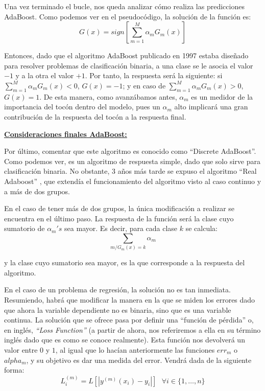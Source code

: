 \documentclass[12pt,twoside]{article}
\begin{document}
Una vez terminado el bucle, nos queda analizar cómo realiza las predicciones AdaBoost. Como podemos ver en el pseudocódigo, la solución de la función es:
\begin{equation*}
G(x) = sign \left[ \sum_{m=1}^M \alpha_m G_m(x) \right]
\end{equation*}

Entonces, dado que el algoritmo AdaBoost publicado en 1997 estaba diseñado para resolver problemas de clasificación binaria, a una clase se le asocia el valor $-1$ y a la otra el valor $+1$. Por tanto, la respuesta será la siguiente: si $\sum_{m=1}^M \alpha_m G_m(x) < 0$, $G(x) = - 1$; y en caso de $\sum_{m=1}^M \alpha_m G_m(x) > 0$, $G(x) = 1$. De esta manera, como avanzábamos antes, $\alpha_m$ es un medidor de la importancia del tocón dentro del modelo, pues un $\alpha_m$ alto implicará una gran contribución de la respuesta del tocón a la respuesta final.

\bigskip \bigskip \bigskip \bigskip \bigskip

\textbf{\underline{Consideraciones finales AdaBoost:}}

Por último, comentar que este algoritmo es conocido como ``Discrete AdaBoost''. Como podemos ver, es un algoritmo de respuesta simple, dado que solo sirve para clasificación binaria. No obstante, 3 años más tarde se expuso el algoritmo ``Real Adaboost'' \cite{FR02}, que extendía el funcionamiento del algoritmo visto al caso continuo y a más de dos grupos.

En el caso de tener más de dos grupos, la única modificación a realizar se encuentra en el último paso. La respuesta de la función será la clase cuyo sumatorio de $\alpha_m's$ sea mayor. Es decir, para cada clase $k$ se calcula:
\begin{equation*}
\sum_{m / G_m(x) = k} \alpha_m
\end{equation*}

\noindent
y la clase cuyo sumatorio sea mayor, es la que corresponde a la respuesta del algoritmo.

En el caso de un problema de regresión, la solución no es tan inmediata. Resumiendo, habrá que modificar la manera en la que se miden los errores dado que ahora la variable dependiente no es binaria, sino que es una variable continua. La solución que se ofrece pasa por definir una ``función de pérdida'' o, en inglés, \textit{``Loss Function''} (a partir de ahora, nos referiremos a ella en su término inglés dado que es como se conoce realmente). Esta función nos devolverá un valor entre $0$ y $1$, al igual que lo hacían anteriormente las funciones $err_m$ o $alpha_m$, y su objetivo es dar una medida del error. Vendrá dada de la siguiente forma:
\begin{equation*}
L_i^{(m)} = L \left[ |y^{(m)}(x_i) - y_i| \right] \, \, \, \, \forall i \in \{ 1, \dots, n \}
\end{equation*}
\end{document}
